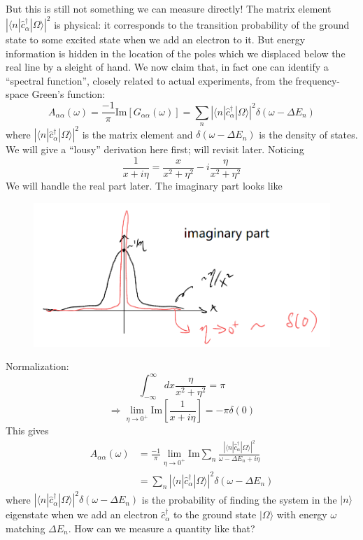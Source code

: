 But this is still not something we can measure directly! The matrix element $\left| \langle n|\hat{c}_{\alpha}^{\dagger}|\Omega \rangle \right|^2$ is physical: it corresponds to the transition probability of the ground state to some excited state when we add an electron to it. But energy information is hidden in the location of the poles which we displaced below the real line by a sleight of hand. We now claim that, in fact one can identify a ``spectral function'', closely related to actual experiments, from the frequency-space Green's function:
\[ A_{\alpha \alpha}\left( \omega \right) =\frac{-1}{\pi}\mathrm{Im}\left[ G_{\alpha \alpha}\left( \omega \right) \right] =\sum_n{\left| \langle n|\hat{c}_{\alpha}^{\dagger}|\Omega \rangle \right|^2\delta \left( \omega -\Delta E_n \right)}\]
where $\left| \langle n|\hat{c}_{\alpha}^{\dagger}|\Omega \rangle \right|^2$ is the matrix element and $\delta \left( \omega -\Delta E_n \right)$ is the density of states. We will give a ``lousy'' derivation here first; will revisit later. Noticing
\[ \frac{1}{x+i\eta}=\frac{x}{x^2+\eta ^2}-i\frac{\eta}{x^2+\eta ^2}\]
We will handle the real part later. The imaginary part looks like

\begin{figure}[ht]
    \centering
    \includegraphics[width=\textwidth]{jupyterbook/data/fig/lec05-fig01.png}
\end{figure}

Normalization:
\[ \int_{-\infty}^{\infty}{dx\frac{\eta}{x^2+\eta ^2}}=\pi \]
\[ \Rightarrow \lim_{\eta \rightarrow 0^+} \mathrm{Im}\left[ \frac{1}{x+i\eta} \right] =-\pi \delta \left( 0 \right) \]
This gives
\begin{align*}
    A_{\alpha \alpha}\left( \omega \right) &=\frac{-1}{\pi}\lim_{\eta \rightarrow 0^+} \mathrm{Im}\sum_n{\frac{\left| \langle n|\hat{c}_{\alpha}^{\dagger}|\Omega \rangle \right|^2}{\omega -\Delta E_n+i\eta}}\\
    &=\sum_n{\left| \langle n|\hat{c}_{\alpha}^{\dagger}|\Omega \rangle \right|^2\delta \left( \omega -\Delta E_n \right)}
\end{align*}
where $\left| \langle n|\hat{c}_{\alpha}^{\dagger}|\Omega \rangle \right|^2\delta(\omega-\Delta E_n)$ is the probability of finding the system in the $|n\rangle$ eigenstate when we add an electron $\hat{c}_{\alpha}^{\dagger}$ to the ground state $|\Omega\rangle$ with energy $\omega$ matching $\Delta E_n$. How can we measure a quantity like that?

